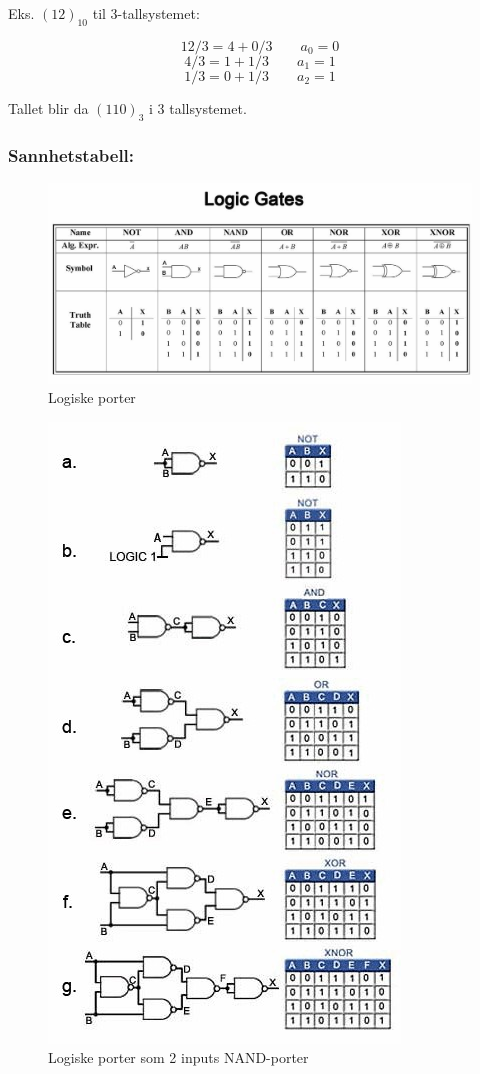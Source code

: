\documentclass{article}
\begin{document}
	Eks. $(12)_{10}$ til 3-tallsystemet:
	
	$$ 12/3 = 4 + 0/3 \qquad a_0 = 0$$
	$$ 4/3 = 1 + 1/3 \qquad a_1 = 1$$
	$$ 1/3 = 0 + 1/3 \qquad a_2 = 1 $$
	
	Tallet blir da $(110)_3$ i 3 tallsystemet.
	
	\subsubsection*{Sannhetstabell:}
		
	\begin{figure}[H]
		\includegraphics[scale=0.35]{GATES.jpg}
		\caption{Logiske porter}
	\end{figure}
	
	\begin{figure}[H]
		\includegraphics{NAND.jpg}
		\caption{Logiske porter som 2 inputs NAND-porter}
	\end{figure}
	
\end{document}
